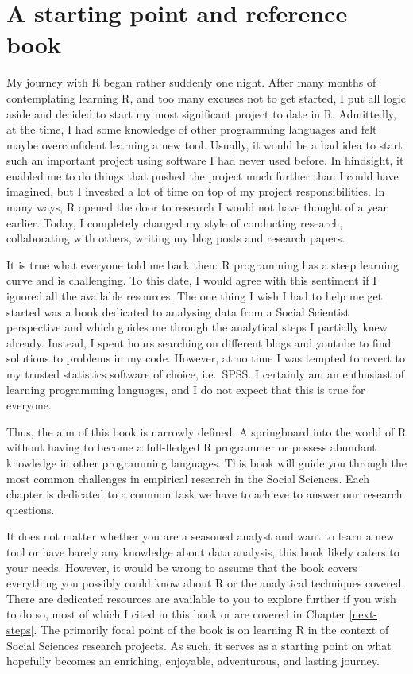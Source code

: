 \documentclass[
]{book}
\begin{document}
\hypertarget{a-starting-point-and-reference-book}{%
\section{A starting point and reference book}\label{a-starting-point-and-reference-book}}

My journey with R began rather suddenly one night. After many months of contemplating learning R, and too many excuses not to get started, I put all logic aside and decided to start my most significant project to date in R. Admittedly, at the time, I had some knowledge of other programming languages and felt maybe overconfident learning a new tool. Usually, it would be a bad idea to start such an important project using software I had never used before. In hindsight, it enabled me to do things that pushed the project much further than I could have imagined, but I invested a lot of time on top of my project responsibilities. In many ways, R opened the door to research I would not have thought of a year earlier. Today, I completely changed my style of conducting research, collaborating with others, writing my blog posts and research papers.

It is true what everyone told me back then: R programming has a steep learning curve and is challenging. To this date, I would agree with this sentiment if I ignored all the available resources. The one thing I wish I had to help me get started was a book dedicated to analysing data from a Social Scientist perspective and which guides me through the analytical steps I partially knew already. Instead, I spent hours searching on different blogs and youtube to find solutions to problems in my code. However, at no time I was tempted to revert to my trusted statistics software of choice, i.e.~SPSS. I certainly am an enthusiast of learning programming languages, and I do not expect that this is true for everyone.

Thus, the aim of this book is narrowly defined: A springboard into the world of R without having to become a full-fledged R programmer or possess abundant knowledge in other programming languages. This book will guide you through the most common challenges in empirical research in the Social Sciences. Each chapter is dedicated to a common task we have to achieve to answer our research questions.

It does not matter whether you are a seasoned analyst and want to learn a new tool or have barely any knowledge about data analysis, this book likely caters to your needs. However, it would be wrong to assume that the book covers everything you possibly could know about R or the analytical techniques covered. There are dedicated resources are available to you to explore further if you wish to do so, most of which I cited in this book or are covered in Chapter \ref{next-steps}. The primarily focal point of the book is on learning R in the context of Social Sciences research projects. As such, it serves as a starting point on what hopefully becomes an enriching, enjoyable, adventurous, and lasting journey.
\end{document}

